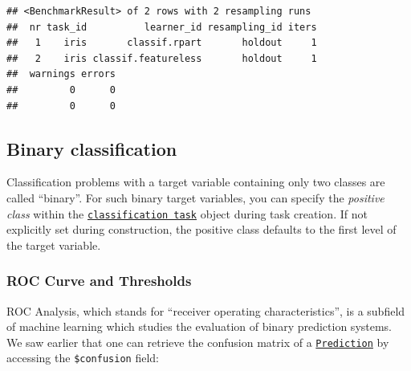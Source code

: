 \documentclass[]{article}
\newenvironment{Shaded}{\begin{snugshade}}{\end{snugshade}}
\newcommand{\CommentTok}[1]{\textcolor[rgb]{0.56,0.35,0.01}{\textit{#1}}}
\newcommand{\DataTypeTok}[1]{\textcolor[rgb]{0.13,0.29,0.53}{#1}}
\newcommand{\KeywordTok}[1]{\textcolor[rgb]{0.13,0.29,0.53}{\textbf{#1}}}
\newcommand{\NormalTok}[1]{#1}
\newcommand{\OperatorTok}[1]{\textcolor[rgb]{0.81,0.36,0.00}{\textbf{#1}}}
\newcommand{\StringTok}[1]{\textcolor[rgb]{0.31,0.60,0.02}{#1}}
\renewenvironment{Shaded} {\begin{snugshade}\small} {\end{snugshade}}
\begin{document}
\begin{verbatim}
## <BenchmarkResult> of 2 rows with 2 resampling runs
##  nr task_id          learner_id resampling_id iters
##   1    iris       classif.rpart       holdout     1
##   2    iris classif.featureless       holdout     1
##  warnings errors
##         0      0
##         0      0
\end{verbatim}

\hypertarget{binary}{%
\subsection{Binary classification}\label{binary}}

Classification problems with a target variable containing only two classes are called ``binary''.
For such binary target variables, you can specify the \emph{positive class} within the \href{https://mlr3.mlr-org.com/reference/TaskClassif.html}{\texttt{classification\ task}} object during task creation.
If not explicitly set during construction, the positive class defaults to the first level of the target variable.

\begin{Shaded}
\end{Shaded}

\hypertarget{binary-roc}{%
\subsubsection{ROC Curve and Thresholds}\label{binary-roc}}

ROC Analysis, which stands for ``receiver operating characteristics'', is a subfield of machine learning which studies the evaluation of binary prediction systems.
We saw earlier that one can retrieve the confusion matrix of a \href{https://mlr3.mlr-org.com/reference/Prediction.html}{\texttt{Prediction}} by accessing the \texttt{\$confusion} field:
\end{document}
